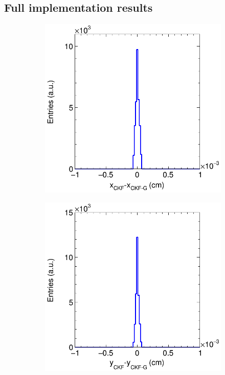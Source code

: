 \subsection{Full implementation results}
\label{Sec:FullImp}
\begin{figure}[t]
     \centering
     \begin{subfigure}{0.32\textwidth}
         \centering
         \includegraphics[width=\textwidth]{figures/ch5-KF_NDGAr/FullSample/Integration/ParDiffX.png}
         \caption{}
         \label{fig:diffX_Integration}
     \end{subfigure}
     \begin{subfigure}{0.32\textwidth}
         \centering
         \includegraphics[width=\textwidth]{figures/ch5-KF_NDGAr/FullSample/Integration/ParDiffP0.png}

\end{subfigure}
\end{figure}

